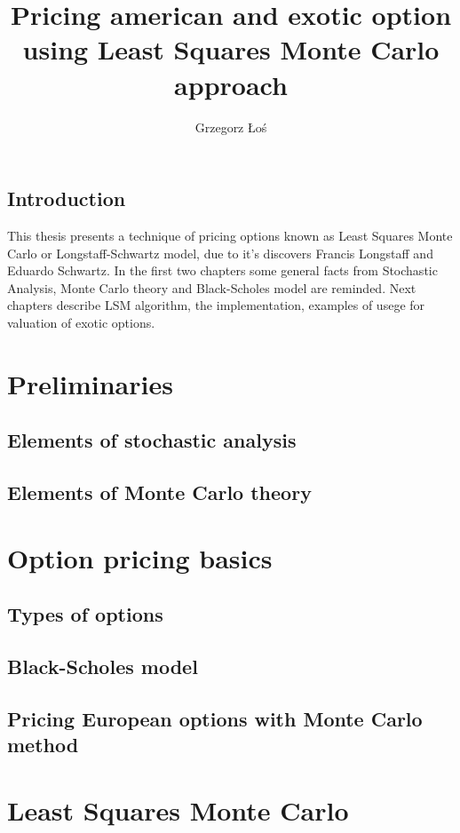 \documentclass[a4paper,12pt]{book}
\title{Pricing american and exotic option using Least Squares Monte Carlo approach}
\author{Grzegorz Łoś}
\begin{document}
 
\section{Introduction}
  This thesis presents a technique of pricing options known as Least Squares Monte Carlo or Longstaff-Schwartz model, due to it's discovers Francis Longstaff and Eduardo Schwartz. In the first two chapters some general facts from Stochastic Analysis, Monte Carlo theory and Black-Scholes model are reminded. Next chapters describe LSM algorithm, the implementation, examples of usege for valuation of exotic options.

\chapter{Preliminaries}
\section{Elements of stochastic analysis}
\section{Elements of Monte Carlo theory}

\chapter{Option pricing basics}
\section{Types of options}
\section{Black-Scholes model}
\section{Pricing European options with Monte Carlo method}

\chapter{Least Squares Monte Carlo}
\end{document}
